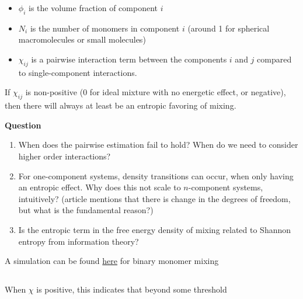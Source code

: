 \documentclass{article}
\begin{document}
\begin{itemize}
    \item $\phi_i$ is the volume fraction of component $i$
    \item $N_i$ is the number of monomers in component $i$ (around 1 for spherical macromolecules or small molecules)
    \item $\chi_{ij}$ is a pairwise interaction term between the components $i$ and $j$ compared to single-component interactions.
\end{itemize}

If $\chi_{ij}$ is non-positive (0 for ideal mixture with no energetic effect, or negative), then there will always at least be an entropic favoring of mixing.

\textbf{Question}

\begin{enumerate}
    \item When does the pairwise estimation fail to hold? When do we need to consider higher order interactions?
    \item For one-component systems, density transitions can occur, when only having an entropic effect. Why does this not scale to $n$-component systems, intuitively? (article mentions that there is change in the degrees of freedom, but what is the fundamental reason?)
    \item Is the entropic term in the free energy density of mixing related to Shannon entropy from information theory?
\end{enumerate}

A simulation can be found \href{https://www.desmos.com/calculator/0n2oervaub}{here} for binary monomer mixing
\subsection{}

When $\chi$ is positive, this indicates that beyond some threshold 
\end{document}
